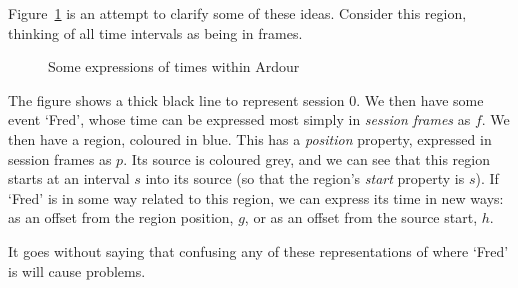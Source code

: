 \documentclass[10pt,a4paper]{book}
\begin{document}
Figure~\ref{fig:times-with-regions} is an attempt to clarify some of
these ideas.  Consider this region, thinking of all time intervals as
being in frames.

\begin{figure}[ht]
\begin{center}
\end{center}
\caption{Some expressions of times within Ardour}
\label{fig:times-with-regions}
\end{figure}

The figure shows a thick black line to represent session $0$.  We then
have some event `Fred', whose time can be expressed most simply in
\emph{session frames} as $f$.  We then have a region, coloured in
blue.  This has a \emph{position} property, expressed in session
frames as $p$.  Its source is coloured grey, and we can see that this
region starts at an interval $s$ into its source (so that the region's
\emph{start} property is $s$).  If `Fred' is in some way related to
  this region, we can express its time in new ways: as an offset from
  the region position, $g$, or as an offset from the source start,
  $h$.

It goes without saying that confusing any of these representations of
where `Fred' is will cause problems.
\end{document}

